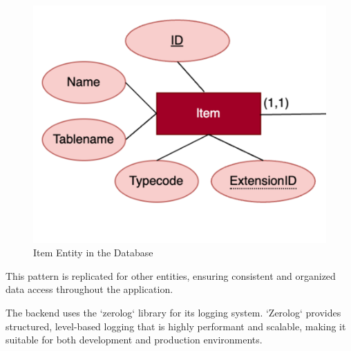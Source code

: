 \begin{figure}[ht]
    \centering
    \includegraphics[scale=0.4]{./images/database/item_er}
    \caption{Item Entity in the Database}
    \label{fig:item_database_model}
\end{figure}

This pattern is replicated for other entities, ensuring consistent and organized data access throughout the application.


The backend uses the `zerolog` library for its logging system.
`Zerolog` provides structured, level-based logging that is highly performant and scalable, making it suitable for both development and production environments.


